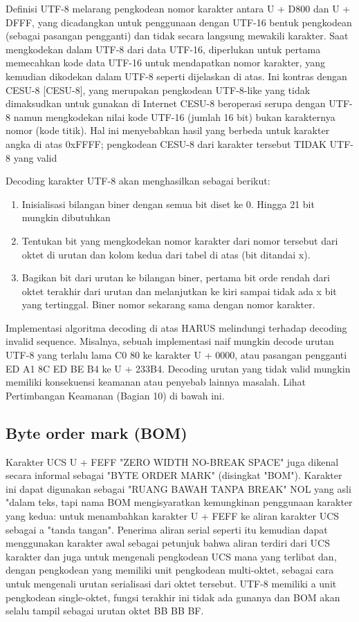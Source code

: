 \begin{itemize}
    Definisi UTF-8 melarang pengkodean nomor karakter antara
   U + D800 dan U + DFFF, yang dicadangkan untuk penggunaan dengan UTF-16
   bentuk pengkodean (sebagai pasangan pengganti) dan tidak secara langsung mewakili
   karakter. Saat mengkodekan dalam UTF-8 dari data UTF-16, diperlukan
   untuk pertama memecahkan kode data UTF-16 untuk mendapatkan nomor karakter, yang
   kemudian dikodekan dalam UTF-8 seperti dijelaskan di atas. Ini kontras dengan
   CESU-8 [CESU-8], yang merupakan pengkodean UTF-8-like yang tidak dimaksudkan untuk
   gunakan di Internet CESU-8 beroperasi serupa dengan UTF-8 namun mengkodekan
   nilai kode UTF-16 (jumlah 16 bit) bukan karakternya
   nomor (kode titik). Hal ini menyebabkan hasil yang berbeda untuk karakter
   angka di atas 0xFFFF; pengkodean CESU-8 dari karakter tersebut TIDAK
   UTF-8 yang valid

   Decoding karakter UTF-8 akan menghasilkan sebagai berikut:
   \begin{enumerate}
   \item Inisialisasi bilangan biner dengan semua bit diset ke 0. Hingga 21 bit
       mungkin dibutuhkan

   \item Tentukan bit yang mengkodekan nomor karakter dari nomor tersebut
       dari oktet di urutan dan kolom kedua dari tabel
       di atas (bit ditandai x).

   \item Bagikan bit dari urutan ke bilangan biner, pertama
       bit orde rendah dari oktet terakhir dari urutan dan
       melanjutkan ke kiri sampai tidak ada x bit yang tertinggal. Biner
       nomor sekarang sama dengan nomor karakter.
    \end{enumerate}
   Implementasi algoritma decoding di atas HARUS melindungi terhadap
   decoding invalid sequence. Misalnya, sebuah implementasi naif mungkin
   decode urutan UTF-8 yang terlalu lama C0 80 ke karakter U + 0000,
   atau pasangan pengganti ED A1 8C ED BE B4 ke U + 233B4. Decoding
   urutan yang tidak valid mungkin memiliki konsekuensi keamanan atau penyebab lainnya
   masalah. Lihat Pertimbangan Keamanan (Bagian 10) di bawah ini.

	\subsection{Byte order mark (BOM)}
   Karakter UCS U + FEFF "ZERO WIDTH NO-BREAK SPACE" juga dikenal
   secara informal sebagai "BYTE ORDER MARK" (disingkat "BOM"). Karakter ini
   dapat digunakan sebagai "RUANG BAWAH TANPA BREAK" NOL yang asli "dalam teks, tapi
   nama BOM mengisyaratkan kemungkinan penggunaan karakter yang kedua: untuk
   menambahkan karakter U + FEFF ke aliran karakter UCS sebagai a
   "tanda tangan". Penerima aliran serial seperti itu kemudian dapat menggunakan
   karakter awal sebagai petunjuk bahwa aliran terdiri dari UCS
   karakter dan juga untuk mengenali pengkodean UCS mana yang terlibat dan,
   dengan pengkodean yang memiliki unit pengkodean multi-oktet, sebagai cara untuk mengenali urutan serialisasi dari oktet tersebut. UTF-8 memiliki a
   unit pengkodean single-oktet, fungsi terakhir ini tidak ada gunanya dan BOM
   akan selalu tampil sebagai urutan oktet BB BB BF.


\end{itemize}
